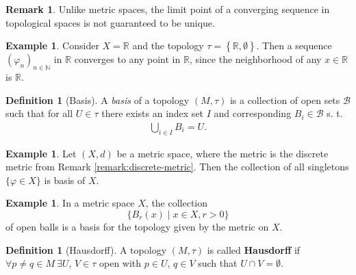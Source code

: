 \documentclass[12pt, a4paper]{article}
\numberwithin{equation}{section}
\theoremstyle{definition}
\theoremstyle{definition}
\newtheorem{defn}[thm]{Definition} %
\newtheorem{exmp}[thm]{Example} %
\newtheorem{remark}[thm]{Remark} %
\newcommand{\seq}[1][\varphi]{\left( #1 \right)_{n \in \mathbb{N}}}
\begin{document}
	\begin{remark}
		Unlike metric spaces, the limit point of a converging sequence in topological spaces is not guaranteed to be unique.
	\end{remark}
	
	\begin{exmp}
		Consider $X = \mathbb R$ and the topology $\tau = \left\{\mathbb R, \emptyset\right\}$. Then a sequence $\seq[\varphi_n]$ in $\mathbb R$ converges to any point in $\mathbb R$, since the neighborhood of any $x\in \mathbb R$ is $\mathbb R$.
	\end{exmp}

	\begin{defn}[Basis]
		A \textit{basis} of a topology $\left(M, \tau\right)$ is a collection of open sets $\mathcal B$ such that for all $U\in \tau$ there exists an index set $I$ and corresponding $B_i\in \mathcal B$ s. t. 
		\begin{align}
			\bigcup_{i\in I}B_i = U. 
		\end{align}
	\end{defn}
	
	\begin{exmp}\label{basis_discrete_metric}
		Let $(X, d)$ be a metric space, where the metric is the discrete metric from Remark \ref{remark:discrete-metric}. Then the collection of all singletons $\{\varphi\in X\}$ is basis of $X$. 
	\end{exmp}
	
	\begin{exmp}\label{basis_metric_space}
		In a metric space $X$, the collection $$\{ B_{r}(x) \mid x\in X, r > 0 \}$$ of open balls is a basis for the topology given by the metric on $X$. 
	\end{exmp}
	
	\begin{defn}[Hausdorff]
		A topology $\left(M, \tau\right)$ is called \textbf{Hausdorff} if $\forall p\ne q \in M \ \exists U$, $V\in \tau$ open with $p\in U$, $q\in V$ such that $U\cap V = \emptyset$.  
	\end{defn} 
	
\end{document}
